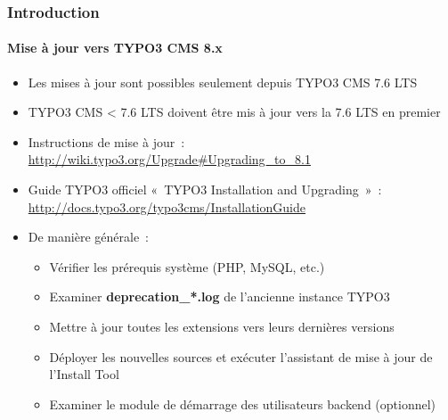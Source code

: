 \begin{frame}[fragile]
	\frametitle{Introduction}
	\framesubtitle{Mise à jour vers TYPO3 CMS 8.x}

	\begin{itemize}
		\item Les mises à jour sont possibles seulement depuis TYPO3 CMS 7.6 LTS
		\item TYPO3 CMS < 7.6 LTS doivent être mis à jour vers la 7.6 LTS en premier
	\end{itemize}

	\begin{itemize}

		\item Instructions de mise à jour~:\newline
			\smaller\url{http://wiki.typo3.org/Upgrade#Upgrading_to_8.1}\normalsize
		\item Guide TYPO3 officiel «~TYPO3 Installation and Upgrading~»~:
			\smaller\url{http://docs.typo3.org/typo3cms/InstallationGuide}\normalsize
		\item De manière générale~:
			\begin{itemize}
				\item Vérifier les prérequis système \small(PHP, MySQL, etc.)
				\item Examiner \textbf{deprecation\_*.log} de l'ancienne instance TYPO3
				\item Mettre à jour toutes les extensions vers leurs dernières versions
				\item Déployer les nouvelles sources et exécuter l'assistant de mise à jour de l'Install Tool
				\item Examiner le module de démarrage des utilisateurs backend (optionnel)
			\end{itemize}
	\end{itemize}

\end{frame}


